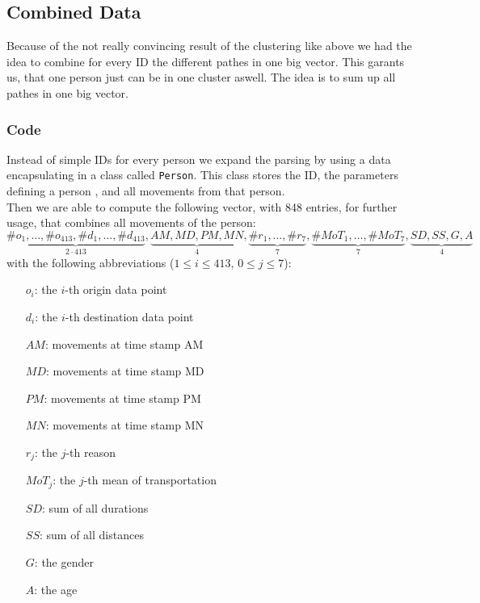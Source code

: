 \subsection{Combined Data}

Because of the not really convincing result of the clustering like above we had the idea to combine for every ID the different pathes in one big vector. This garants us, that one person just can be in one cluster aswell. The idea is to sum up all pathes in one big vector.
\subsubsection{Code}

Instead of simple IDs for every person we expand the parsing by using a data encapsulating in a class called \texttt{Person}. This class stores the ID, the parameters defining a person %
, and all movements from that person.\\
Then we are able to compute the following vector, with 848 entries, for further usage, that combines all movements of the person:
$$\underbrace{\#o_1, \dots, \#o_{413}, \#d_1, \dots, \#d_{413}}_{2\cdot 413} ,
 \underbrace{\mathit{AM}, \mathit{MD}, \mathit{PM}, \mathit{MN}}_{4}, 
 \underbrace{\#r_1, \dots, \#r_7}_{7}, 
 \underbrace{\#\mathit{MoT}_1, \dots, \#\mathit{MoT}_7}_{7}, 
 \underbrace{\mathit{SD}, \mathit{SS}, \mathit{G}, \mathit{A}}_{4}$$
with the following abbreviations ($1 \le i \le 413$, $0 \le j \le 7$):
\begin{multicols}{2}
\begin{itemize}
	\item[$o_i$:]  the $i$-th origin data point
	\item[$d_i$:]  the $i$-th destination data point
	\item[$\mathit{AM}$:] movements at time stamp AM
	\item[$\mathit{MD}$:] movements at time stamp MD
	\item[$\mathit{PM}$:] movements at time stamp PM
	\item[$\mathit{MN}$:] movements at time stamp MN
	\item[$r_j$:] the $j$-th reason
	\item[$\mathit{MoT}_j$:] the $j$-th mean of transportation
	\item[$\mathit{SD}$:] sum of all durations
	\item[$\mathit{SS}$:] sum of all distances
	\item[$\mathit{G}$:] the gender
	\item[$\mathit{A}$:] the age
\end{itemize}
\end{multicols}

